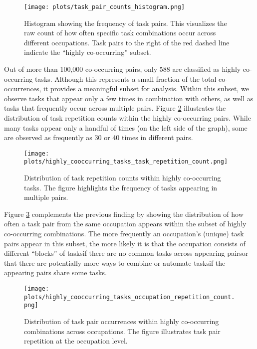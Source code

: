 \documentclass{article}
\theoremstyle{plain}
\theoremstyle{plain}
\begin{document}
\begin{figure}[htbp]
  \centering
  \texttt{[image: plots/task\_pair\_counts\_histogram.png]}
  \caption{Histogram showing the frequency of task pairs. This visualizes the raw count of how often specific task combinations occur across different occupations. Task pairs to the right of the red dashed line indicate the “highly co-occurring” subset.}
  \label{fig:pair_counts}
\end{figure}

Out of more than 100,000 co-occurring pairs, only 588 are classified as highly co-occurring tasks. 
Although this represents a small fraction of the total co-occurrences, it provides a meaningful subset for analysis.
Within this subset, we observe tasks that appear only a few times in combination with others, as well as tasks that frequently occur across multiple pairs. 
Figure \ref{fig:high_cooc_task} illustrates the distribution of task repetition counts within the highly co-occurring pairs. 
While many tasks appear only a handful of times (on the left side of the graph), some are observed as frequently as 30 or 40 times in different pairs.

\begin{figure}[htbp]
  \centering
  \texttt{[image: plots/highly\_cooccurring\_tasks\_task\_repetition\_count.png]}
  \caption{Distribution of task repetition counts within highly co-occurring tasks. The figure highlights the frequency of tasks appearing in multiple pairs.}
  \label{fig:high_cooc_task}
\end{figure}

Figure \ref{fig:high_cooc_occ} complements the previous finding by showing the distribution of how often a task pair from the same occupation appears within the subset of highly co-occurring combinations.
The more frequently an occupation’s (unique) task pairs appear in this subset, the more likely it is that the occupation consists of different “blocks” of tasks\textemdash if there are no common tasks across appearing pairs\textemdash or that there are potentially more ways to combine or automate tasks\textemdash if the appearing pairs share some tasks.

\begin{figure}[htbp]
  \centering
  \texttt{[image: plots/highly\_cooccurring\_tasks\_occupation\_repetition\_count.png]}
  \caption{Distribution of task pair occurrences within highly co-occurring combinations across occupations. The figure illustrates task pair repetition at the occupation level.}
  \label{fig:high_cooc_occ}
\end{figure}
\end{document}
